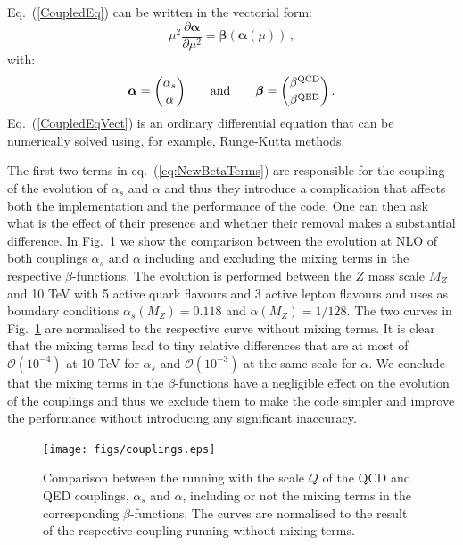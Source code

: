 Eq.~(\ref{CoupledEq}) can be written in the vectorial form:
\begin{equation}\label{CoupledEqVect}
\mu^2\frac{\partial {\bm \alpha}}{\partial \mu^2} = {\bm \beta}\left({\bm \alpha}(\mu)\right)\,,
\end{equation}
with:
\begin{equation}
  {\bm \alpha} = {\alpha_s \choose \alpha}\qquad\mbox{and}\qquad  {\bm \beta} = {\beta^{\rm QCD} \choose \beta^{\rm QED}}\,.
\end{equation}
Eq.~(\ref{CoupledEqVect}) is an ordinary differential equation that
can be numerically solved using, for example, Runge-Kutta methods.

The first two terms in eq.~(\ref{eq:NewBetaTerms}) are responsible for
the coupling of the evolution of $\alpha_s$ and $\alpha$ and thus they
introduce a complication that affects both the implementation and the
performance of the code. One can then ask what is the effect of their
presence and whether their removal makes a substantial difference. In
Fig.~\ref{fig:CouplingEvol} we show the comparison between the
evolution at NLO of both couplings $\alpha_s$ and $\alpha$ including
and excluding the mixing terms in the respective
$\beta$-functions. The evolution is performed between the $Z$ mass
scale $M_Z$ and 10 TeV with 5 active quark flavours and 3 active
lepton flavours and uses as boundary conditions
$\alpha_s(M_Z) = 0.118$ and $\alpha(M_Z) = 1/128$. The two curves in
Fig.~\ref{fig:CouplingEvol} are normalised to the respective curve
without mixing terms. It is clear that the mixing terms lead to tiny
relative differences that are at most of $\mathcal{O}(10^{-4})$ at 10
TeV for $\alpha_s$ and $\mathcal{O}(10^{-3})$ at the same scale for
$\alpha$. We conclude that the mixing terms in the $\beta$-functions
have a negligible effect on the evolution of the couplings and thus we
exclude them to make the code simpler and improve the performance
without introducing any significant inaccuracy.

\begin{figure}[h]
\texttt{[image: figs/couplings.eps]} 
\caption{Comparison between the running with the scale
$Q$ of the QCD and QED couplings,
  $\alpha_s$ and $\alpha$, including or not the mixing terms in
  the corresponding $\beta$-functions.
%
  The curves are normalised to the result of the respective coupling
  running without mixing terms.}
\label{fig:CouplingEvol}
\end{figure}

